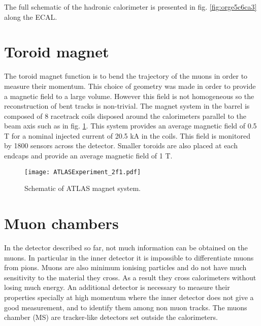 The full schematic of the hadronic calorimeter is presented in fig. \ref{fig:orge5c6ca3} along the ECAL.


\section{Toroid magnet}
\label{sec:org509468c}

The toroid magnet function is to bend the trajectory of the muons in order to measure their momentum.
This choice of geometry was made in order to provide a magnetic field to a large volume.
However this field is not homogeneous so the reconstruction of bent tracks is non-trivial.
The magnet system in the barrel is composed of 8 racetrack coils disposed  around the calorimeters parallel to the beam axis such as in fig. \ref{fig:orga5e07f8}.
This system provides an average magnetic field  of 0.5 T for a nominal injected current of 20.5 kA in the coils.
This field is monitored by 1800 sensors across the detector.
Smaller toroids are also placed at each endcaps and provide an average magnetic field of 1 T.

\begin{figure}[htbp]
\centering
\texttt{[image: ATLASExperiment\_2f1.pdf]}
\caption{\label{fig:orga5e07f8}
Schematic of ATLAS magnet system.\cite{ATLASExperiment}}
\end{figure}


\section{Muon chambers}
\label{sec:orga8c4c2b}

In the detector described so far, not much information can be obtained on the muons.
In particular in the inner detector it is impossible to differentiate muons from pions.
Muons are also minimum ionising particles and do not have much sensitivity to the material they cross.
As a result they cross calorimeters without losing much energy.
An additional detector is necessary to measure their properties specially at high momentum where the inner detector does not give a good measurement, and to identify them among non muon tracks.
The muons chamber (MS) are tracker-like detectors set outside the calorimeters.

